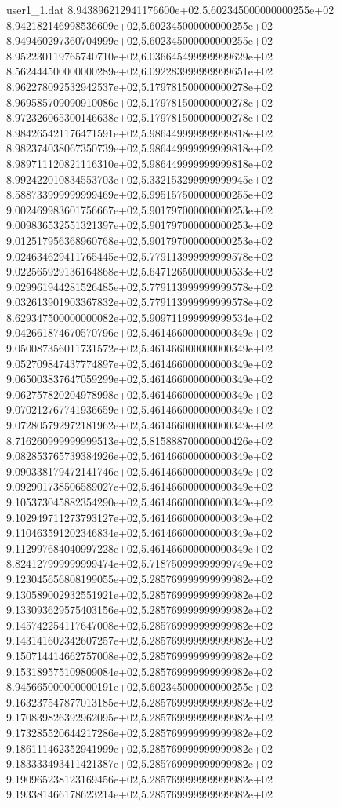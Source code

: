 \begin{filecontents}{user1_1.dat}
8.943896212941176600e+02,5.602345000000000255e+02
8.942182146998536609e+02,5.602345000000000255e+02
8.949460297360704999e+02,5.602345000000000255e+02
8.952230119765740710e+02,6.036645499999999629e+02
8.562444500000000289e+02,6.092283999999999651e+02
8.962278092532942537e+02,5.179781500000000278e+02
8.969585709090910086e+02,5.179781500000000278e+02
8.972326065300146638e+02,5.179781500000000278e+02
8.984265421176471591e+02,5.986449999999999818e+02
8.982374038067350739e+02,5.986449999999999818e+02
8.989711120821116310e+02,5.986449999999999818e+02
8.992422010834553703e+02,5.332153299999999945e+02
8.588733999999999469e+02,5.995157500000000255e+02
9.002469983601756667e+02,5.901797000000000253e+02
9.009836532551321397e+02,5.901797000000000253e+02
9.012517956368960768e+02,5.901797000000000253e+02
9.024634629411765445e+02,5.779113999999999578e+02
9.022565929136164868e+02,5.647126500000000533e+02
9.029961944281526485e+02,5.779113999999999578e+02
9.032613901903367832e+02,5.779113999999999578e+02
8.629347500000000082e+02,5.909711999999999534e+02
9.042661874670570796e+02,5.461466000000000349e+02
9.050087356011731572e+02,5.461466000000000349e+02
9.052709847437774897e+02,5.461466000000000349e+02
9.065003837647059299e+02,5.461466000000000349e+02
9.062757820204978998e+02,5.461466000000000349e+02
9.070212767741936659e+02,5.461466000000000349e+02
9.072805792972181962e+02,5.461466000000000349e+02
8.716260999999999513e+02,5.815888700000000426e+02
9.082853765739384926e+02,5.461466000000000349e+02
9.090338179472141746e+02,5.461466000000000349e+02
9.092901738506589027e+02,5.461466000000000349e+02
9.105373045882354290e+02,5.461466000000000349e+02
9.102949711273793127e+02,5.461466000000000349e+02
9.110463591202346834e+02,5.461466000000000349e+02
9.112997684040997228e+02,5.461466000000000349e+02
8.824127999999999474e+02,5.718750999999999749e+02
9.123045656808199055e+02,5.285769999999999982e+02
9.130589002932551921e+02,5.285769999999999982e+02
9.133093629575403156e+02,5.285769999999999982e+02
9.145742254117647008e+02,5.285769999999999982e+02
9.143141602342607257e+02,5.285769999999999982e+02
9.150714414662757008e+02,5.285769999999999982e+02
9.153189575109809084e+02,5.285769999999999982e+02
8.945665000000000191e+02,5.602345000000000255e+02
9.163237547877013185e+02,5.285769999999999982e+02
9.170839826392962095e+02,5.285769999999999982e+02
9.173285520644217286e+02,5.285769999999999982e+02
9.186111462352941999e+02,5.285769999999999982e+02
9.183333493411421387e+02,5.285769999999999982e+02
9.190965238123169456e+02,5.285769999999999982e+02
9.193381466178623214e+02,5.285769999999999982e+02

\end{filecontents}
